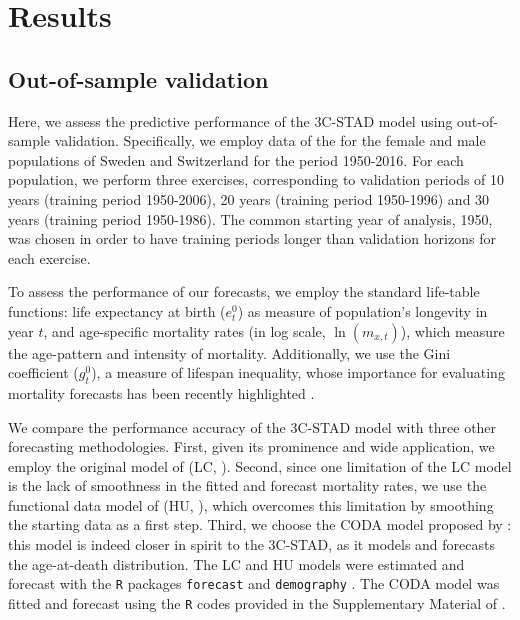 \documentclass[11pt, a4paper]{article}
\begin{document}

\section{Results}\label{Sec:Results}


\subsection{Out-of-sample validation}\label{Subsec:OutOfSample}

Here, we assess the predictive performance of the 3C-STAD model using out-of-sample validation. Specifically, we employ data of the \cite{HMD} for the female and male populations of Sweden and Switzerland for the period 1950-2016. For each population, we perform three exercises, corresponding to validation periods of 10 years (training period 1950-2006), 20 years (training period 1950-1996) and 30 years (training period 1950-1986). The common starting year of analysis, 1950, was chosen in order to have training periods longer than validation horizons for each exercise. 

To assess the performance of our forecasts, we employ the standard life-table functions: life expectancy at birth ($e_{t}^{0}$) as measure of population's longevity in year $t$, and age-specific mortality rates (in log scale, $\ln(m_{x,t})$), which measure the age-pattern and intensity of mortality. Additionally, we use the Gini coefficient ($g^{0}_{t}$), a measure of lifespan inequality, whose importance for evaluating mortality forecasts has been recently highlighted \citep{bohk2017lifespan}. 

We compare the performance accuracy of the 3C-STAD model with three other forecasting methodologies. First, given its prominence and wide application, we employ the original model of \citeauthor{lee1992modeling} (LC, \citeyear{lee1992modeling}). Second, since one limitation of the LC model is the lack of smoothness in the fitted and forecast mortality rates, we use the functional data model of \citeauthor{hyndman2007robust} (HU, \citeyear{hyndman2007robust}), which overcomes this limitation by smoothing the starting data as a first step. Third, we choose the CODA model proposed by \cite{oeppen2008coherent}: this model is indeed closer in spirit to the 3C-STAD, as it models and forecasts the age-at-death distribution. The LC and HU models were estimated and forecast with the \texttt{R} packages \texttt{forecast} and \texttt{demography} \citep{hyndman2018forecastR,demogRpackage,hyndman2008automatic}. The CODA model was fitted and forecast using the \texttt{R} codes provided in the Supplementary Material of \cite{bergeron2017coherent}. 
\end{document}
